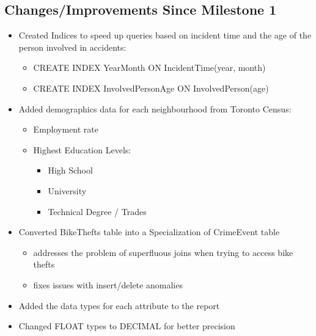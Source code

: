\documentclass[12pt, a4paper]{article}
\begin{document}
\subsection*{Changes/Improvements Since Milestone 1}
\begin{itemize}
    \item Created Indices to speed up queries based on incident time and the age of the person involved in accidents:
    \begin{itemize}
        \item CREATE INDEX YearMonth ON IncidentTime(year, month)
        \item CREATE INDEX InvolvedPersonAge ON InvolvedPerson(age)
    \end{itemize}
    \item Added demographics data for each neighbourhood from Toronto Census:
    \begin{itemize}
        \item Employment rate %
        \item Highest Education Levels:
        \begin{itemize}
            \item High School %
            \item University %
            \item Technical Degree / Trades %
        \end{itemize}
    \end{itemize}
    \item Converted BikeThefts table into a Specialization of CrimeEvent table
    \begin{itemize}
        \item addresses the problem of superfluous joins when trying to access bike thefts
        \item fixes issues with insert/delete anomalies
    \end{itemize}
    \item Added the data types for each attribute to the report
     \item Changed FLOAT types to DECIMAL for better precision
\end{itemize}
\end{document}
